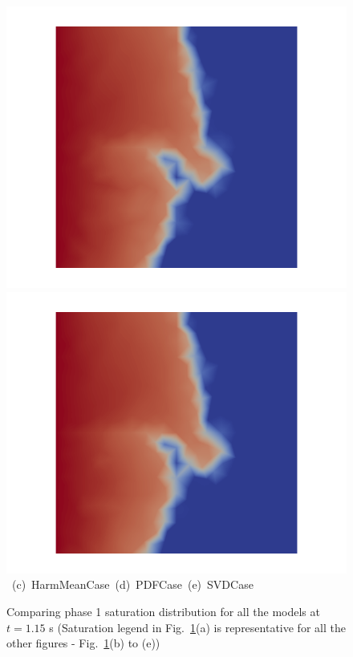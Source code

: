 \begin{landscape}
\begin{figure}[ht]
{{      \includegraphics[width=.56\textwidth]{./Pics/PDFCase/PDFCase_Saturation_t_1dot15.png} 
      \includegraphics[width=.56\textwidth]{./Pics/SVDCase/SVDCase_Saturation_t_1dot15.png}}
\vspace{0.cm}
\hbox{ \hspace{1.75cm} (c) HarmMeanCase \hspace{5.0cm} (d) PDFCase \hspace{5.0cm} (e) SVDCase}
\vspace{0.cm}
}   
\caption{Comparing phase 1 saturation distribution for all the models at $t=1.15$ s (Saturation legend in Fig.~\ref{fig:Saturationfield@t=1.15s}(a) is representative for all the other figures - \ie Fig.~\ref{fig:Saturationfield@t=1.15s}(b) to (e))}
\label{fig:Saturationfield@t=1.15s}
\end{figure}
\end{landscape}
\clearpage
